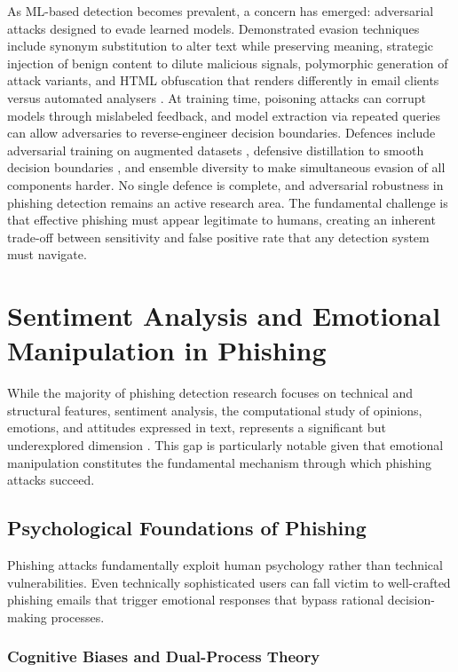As ML-based detection becomes prevalent, a concern has emerged: adversarial attacks designed to evade learned models. Demonstrated evasion techniques include synonym substitution to alter text while preserving meaning, strategic injection of benign content to dilute malicious signals, polymorphic generation of attack variants, and HTML obfuscation that renders differently in email clients versus automated analysers \cite{grosse2017adversarial}. At training time, poisoning attacks can corrupt models through mislabeled feedback, and model extraction via repeated queries can allow adversaries to reverse-engineer decision boundaries. Defences include adversarial training on augmented datasets \cite{goodfellow2014explaining}, defensive distillation to smooth decision boundaries \cite{papernot2016distillation}, and ensemble diversity to make simultaneous evasion of all components harder. No single defence is complete, and adversarial robustness in phishing detection remains an active research area. The fundamental challenge is that effective phishing must appear legitimate to humans, creating an inherent trade-off between sensitivity and false positive rate that any detection system must navigate.

\section{Sentiment Analysis and Emotional Manipulation in Phishing}

While the majority of phishing detection research focuses on technical and structural features, sentiment analysis, the computational study of opinions, emotions, and attitudes expressed in text, represents a significant but underexplored dimension \cite{pang2008opinion}. This gap is particularly notable given that emotional manipulation constitutes the fundamental mechanism through which phishing attacks succeed.

\subsection{Psychological Foundations of Phishing}

Phishing attacks fundamentally exploit human psychology rather than technical vulnerabilities. Even technically sophisticated users can fall victim to well-crafted phishing emails that trigger emotional responses that bypass rational decision-making processes.

\subsubsection{Cognitive Biases and Dual-Process Theory}


